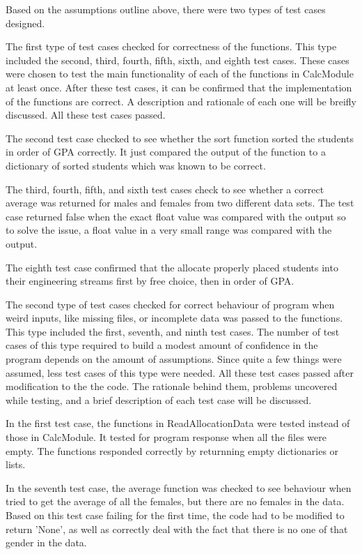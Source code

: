 \documentclass[12pt]{article}
\begin{document}
Based on the assumptions outline above, there were two types of test cases designed.

The first type of test cases checked for correctness of the functions. This type
included the second, third, fourth, fifth, sixth, and eighth test cases. These cases
were chosen to test the main functionality of each of the functions in CalcModule
at least once. After these test cases, it can be confirmed that the implementation
of the functions are correct. A description and rationale of each one will be 
breifly discussed. All these test cases passed.

The second test case checked to see whether the sort function sorted the students
in order of GPA correctly. It just compared the output of the function to
a dictionary of sorted students which was known to be correct. 

The third, fourth, fifth, and sixth test cases check to see whether a correct
average was returned for males and females from two different data sets. The test
case returned false when the exact float value was compared with the output so to
solve the issue, a float value in a very small range was compared with the output.

The eighth test case confirmed that the allocate properly placed students into
their engineering streams first by free choice, then in order of GPA.

The second type of test cases checked for correct behaviour of program when weird
inputs, like missing files, or incomplete data was passed to the functions. This 
type included the first, seventh, and ninth test cases. The number of test cases 
of this type required to build a modest amount of confidence in the program depends
on the amount of assumptions. Since quite a few things were assumed, less test
cases of this type were needed. All these test cases passed after modification to the 
the code. The rationale behind them, problems uncovered while testing, and a brief
description of each test case will be discussed.

In the first test case, the functions in ReadAllocationData were tested instead of
those in CalcModule. It tested for program response when all the files were empty.
The functions responded correctly by returnning empty dictionaries or lists.

In the seventh test case, the average function was checked to see behaviour when
tried to get the average of all the females, but there are no females in the data.
Based on this test case failing for the first time, the code had to be modified to
return 'None', as well as correctly deal with the fact that there is no one of that
gender in the data.
\end{document}

